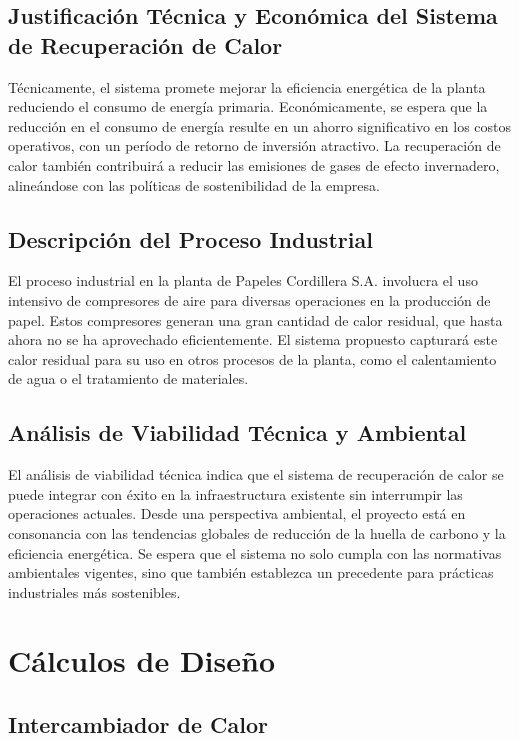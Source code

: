 \documentclass[11pt,a4paper]{article}  %
\begin{document}
\subsection{Justificación Técnica y Económica del Sistema de Recuperación de Calor}
Técnicamente, el sistema promete mejorar la eficiencia energética de la planta reduciendo el consumo de energía primaria. Económicamente, se espera que la reducción en el consumo de energía resulte en un ahorro significativo en los costos operativos, con un período de retorno de inversión atractivo. La recuperación de calor también contribuirá a reducir las emisiones de gases de efecto invernadero, alineándose con las políticas de sostenibilidad de la empresa.

\subsection{Descripción del Proceso Industrial}
El proceso industrial en la planta de Papeles Cordillera S.A. involucra el uso intensivo de compresores de aire para diversas operaciones en la producción de papel. Estos compresores generan una gran cantidad de calor residual, que hasta ahora no se ha aprovechado eficientemente. El sistema propuesto capturará este calor residual para su uso en otros procesos de la planta, como el calentamiento de agua o el tratamiento de materiales.

\subsection{Análisis de Viabilidad Técnica y Ambiental}
El análisis de viabilidad técnica indica que el sistema de recuperación de calor se puede integrar con éxito en la infraestructura existente sin interrumpir las operaciones actuales. Desde una perspectiva ambiental, el proyecto está en consonancia con las tendencias globales de reducción de la huella de carbono y la eficiencia energética. Se espera que el sistema no solo cumpla con las normativas ambientales vigentes, sino que también establezca un precedente para prácticas industriales más sostenibles.


\section{Cálculos de Diseño}

\subsection{Intercambiador de Calor}
\end{document}
